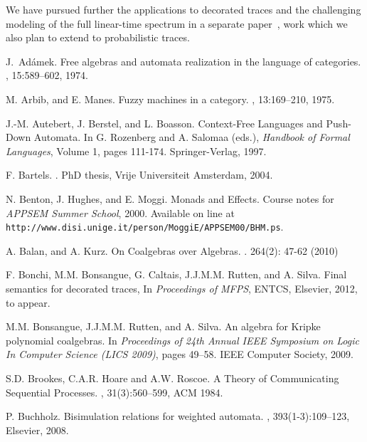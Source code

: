 \documentclass{LMCS}
\begin{document}
We have pursued further the applications to decorated traces and the challenging modeling of the full linear-time spectrum in a separate paper~\cite{mfps}, work which we also plan to extend to probabilistic traces. 
\begin{thebibliography}{10}

J.~Ad\'{a}mek.
\newblock Free algebras and automata realization in the language of categories.
, 15:589--602, 1974.

M. Arbib, and E. Manes.
\newblock Fuzzy machines in a category.
, 13:169--210, 1975.

J.-M. Autebert, J. Berstel, and L. Boasson.
\newblock Context-Free Languages and Push-Down Automata.
\newblock In G. Rozenberg and  A. Salomaa (eds.), {\em Handbook of Formal Languages},
 Volume 1, pages 111-174. Springer-Verlag, 1997.

F. Bartels.
.
\newblock PhD thesis, Vrije Universiteit Amsterdam, 2004.

N. Benton, J. Hughes, and E. Moggi.
\newblock Monads and Effects.
\newblock Course notes for {\em APPSEM Summer School}, 2000. Available on line at
  {\tt http://www.disi.unige.it/person/MoggiE/APPSEM00/BHM.ps}.

A. Balan, and A. Kurz.
\newblock On Coalgebras over Algebras. 
. 264(2): 47-62 (2010)

F. Bonchi, M.M. Bonsangue, G. Caltais, J.J.M.M. Rutten, and A. Silva.
\newblock Final semantics for decorated traces,
\newblock In {\em Proceedings of MFPS}, ENTCS, Elsevier, 2012, to appear.

M.M. Bonsangue, J.J.M.M. Rutten, and A. Silva.
\newblock An algebra for {K}ripke polynomial coalgebras.
\newblock In {\em Proceedings of 24th Annual IEEE Symposium on Logic In Computer
   Science (LICS 2009)}, pages 49--58. IEEE Computer Society, 2009.

S.D. Brookes, C.A.R. Hoare and A.W. Roscoe.
\newblock A Theory of Communicating Sequential Processes.
, 31(3):560--599, ACM 1984.

P. Buchholz.
\newblock Bisimulation relations for weighted automata.
, 393(1-3):109--123, Elsevier, 2008.


\end{thebibliography}
\end{document}
